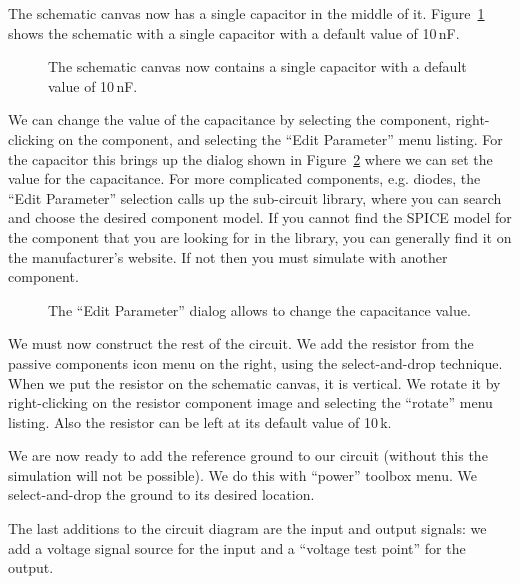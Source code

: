 \documentclass{article}
\begin{document}
The schematic canvas now has a single capacitor in the middle of it. Figure~\ref{fig:5spice:component_dropped} shows the schematic with a single capacitor with a default value of 10\,nF.

\begin{figure}
\begin{center}
\end{center}
\caption{The schematic canvas now contains a single capacitor with a default value of 10\,nF.}
\label{fig:5spice:component_dropped}
\end{figure}

We can change the value of the capacitance by selecting the component, right-clicking on the component, and selecting the ``Edit Parameter'' menu listing.  For the capacitor this brings up the dialog shown in Figure~\ref{fig:5spice:edit_parameter} where we can set the value for the capacitance.  For more complicated components, e.g. diodes, the ``Edit Parameter'' selection calls up the sub-circuit library, where you can search and choose the desired component model.  If you cannot find the SPICE model for the component that you are looking for in the library, you can generally find it on the manufacturer's website. If not then you must simulate with another component.

\begin{figure}
\begin{center}
\end{center}
\caption{The ``Edit Parameter'' dialog allows to change the capacitance value.}
\label{fig:5spice:edit_parameter}
\end{figure}

We must now construct the rest of the circuit.  We add the resistor from the passive components icon menu on the right, using the select-and-drop technique.  When we put the resistor on the schematic canvas, it is vertical.  We rotate it by right-clicking on the resistor component image and selecting the ``rotate'' menu listing.  Also the resistor can be left at its default value of 10\,k\Ohm.

We are now ready to add the reference ground to our circuit (without this the simulation will not be possible).  We do this with ``power'' toolbox menu.  We select-and-drop the ground to its desired location.

The last additions to the circuit diagram are the input and output signals: we add a voltage signal source for the input and a ``voltage test point'' for the output.
\end{document}
